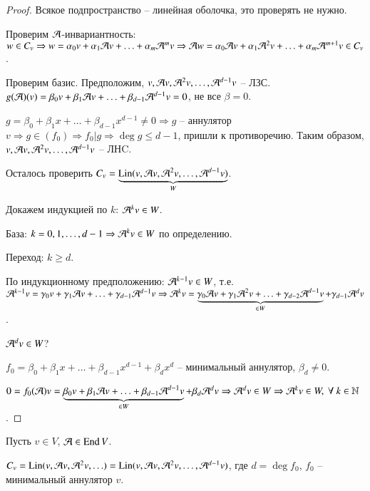 \documentclass[main]{subfiles}
\begin{document}
\begin{proof}
    Всякое подпространство -- линейная оболочка, это проверять не нужно.

    Проверим $\mathcal{A}$-инвариантность: $w \in C_v \Rightarrow w = \alpha_0 v + \alpha_1 \mathcal{A} v + \ldots + \alpha_m {\mathcal{A}}^{m} v \Rightarrow
        \mathcal{A} w = \alpha_0 \mathcal{A} v + \alpha_1 {\mathcal{A}}^2 v + \ldots + \alpha_m {\mathcal{A}}^{m+1} v \in C_v$.

     Проверим базис. Предположим, $v, \mathcal{A} v, {\mathcal{A}}^2 v, \ldots, {\mathcal{A}}^{d-1} v$ -- ЛЗС. $g(\mathcal{A})(v) = \beta_0 v + \beta_1 \mathcal{A} v + \ldots + \beta_{d-1} {\mathcal{A}}^{d-1} v = 0$, не все $\beta = 0$.

    $g = \beta_0 + \beta_1 x + \ldots + \beta_{d-1} x^{d-1} \neq 0 \Rightarrow
        g$ -- аннулятор $v \Rightarrow g \in (f_0) \Rightarrow f_0|g \Rightarrow \deg g \leq d-1$, пришли к противоречию.
    Таким образом, $v, \mathcal{A} v, {\mathcal{A}}^2 v, \ldots, {\mathcal{A}}^{d-1} v$ -- ЛНC.

    Осталось проверить $C_v = \underbrace{\operatorname{Lin}(v, \mathcal{A} v, {\mathcal{A}}^2 v, \ldots, {\mathcal{A}}^{d-1} v)}_{W}$.

    Докажем индукцией по $k$: ${\mathcal{A}}^{k} v \in W$.

    База: $k = 0, 1, \ldots, d-1 \Rightarrow {\mathcal{A}}^k v  \in W$ по определению.

    Переход: $k\geq d$.

    По индукционному предположению: ${\mathcal{A}}^{k-1} v \in W$,
    т.е. ${\mathcal{A}}^{k-1}v = \gamma_0 v + \gamma_1 \mathcal{A} v + \ldots + \gamma_{d-1} {\mathcal{A}}^{d-1} v \Rightarrow
        {\mathcal{A}}^k v = \underbrace{\gamma_0 \mathcal{A} v + \gamma_1 {\mathcal{A}}^2 v + \ldots + \gamma_{d-2} {\mathcal{A}}^{d-1} v}_{\in W} + \gamma_{d-1} {\mathcal{A}}^d v$.

    ${\mathcal{A}}^d v \in W$?

    $f_0 = \beta_0 + \beta_1 x + \ldots + \beta_{d-1} x^{d-1} + \beta_d x^d$ -- минимальный аннулятор, $\beta_d \neq 0$.

    $0 = f_0(\mathcal{A}) v = \underbrace{\beta_0 v +\beta_1 \mathcal{A} v + \ldots + \beta_{d-1} {\mathcal{A}}^{d-1} v}_{\in W} + \beta_d {\mathcal{A}}^d v \Rightarrow {\mathcal{A}}^d v \in W \Rightarrow
        {\mathcal{A}}^k v \in W, \  \forall \ k \in \mathbb{N}$.

\end{proof}


Пусть $v \in V$, $\mathcal{A} \in \operatorname{End} V$.

$C_v = \operatorname{Lin}(v, \mathcal{A} v, {\mathcal{A}}^2 v, \ldots) = \operatorname{Lin}(v, \mathcal{A} v, {\mathcal{A}}^2 v, \ldots, {\mathcal{A}}^{d-1} v)$, где $d = \deg f_0$, $f_0$ -- минимальный аннулятор $v$.
\end{document}
